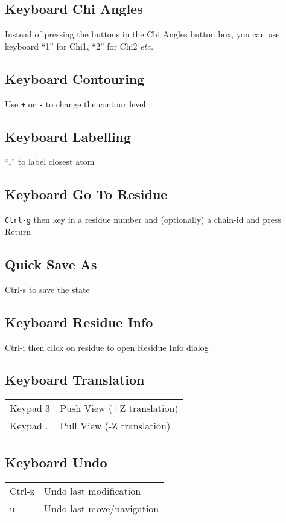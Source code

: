 \documentclass[twocolumn]{article}
\begin{document}
\subsection{Keyboard Chi Angles}
Instead of pressing the buttons in the Chi Angles button box, you can
use keyboard ``1'' for Chi1, ``2'' for Chi2 \emph{etc.}

\subsection{Keyboard Contouring}

Use \texttt{+} or \texttt{-} to change the contour level

\subsection{Keyboard Labelling}
``l'' to label closest atom

\subsection{Keyboard Go To Residue} 
   \texttt{Ctrl-g} then key in a residue number and (optionally) a chain-id 
      and press Return 

\subsection{Quick Save As} 
   Ctrl-s to save the state

\subsection{Keyboard Residue Info} 
   Ctrl-i then click on residue to open Residue Info dialog 

\subsection{Keyboard Translation}
\begin{tabular}{ll}
  Keypad 3 & Push View (+Z translation)\\
  Keypad . & Pull View (-Z translation)
\end{tabular}

\subsection{Keyboard Undo}
\begin{tabular}{ll}

  Ctrl-z & Undo last modification   \\
  u & Undo last move/navigation     \\
\end{tabular}
\end{document}
